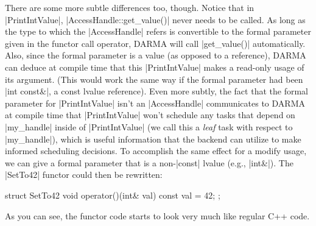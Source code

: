 There are some more subtle differences
too, though.  Notice that in |PrintIntValue|, |AccessHandle::get_value()| never
needs to be called.  As long as the type to which the |AccessHandle| refers is
convertible to the formal parameter given in the functor call operator, DARMA
will call |get_value()| automatically.  Also, since the formal parameter is a
value (as opposed to a reference), DARMA can deduce at compile time that this
|PrintIntValue| makes a read-only usage of its argument.  (This would work the
same way if the formal parameter had been |int const&|, a const lvalue
reference).  Even more subtly, the fact that the formal parameter for
|PrintIntValue| isn't an |AccessHandle| communicates to DARMA at compile time
that |PrintIntValue| won't schedule any tasks that depend on |my_handle| inside
of |PrintIntValue| (we call this a {\it leaf} task with respect to |my_handle|),
which is useful information that the backend can utilize to make informed
scheduling decisions.  To accomplish the same effect for a modify usage, we can
give a formal parameter that is a non-|const| lvalue (e.g., |int&|).  The
|SetTo42| functor could then be rewritten:
\begin{CppCodeNumb}
struct SetTo42 {
  void operator()(int& val) const {
    val = 42;
  }
};
\end{CppCodeNumb}
As you can see, the functor code starts to look very much like regular C++ code.

